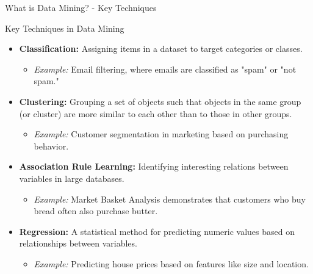 \documentclass[aspectratio=169]{beamer}
\begin{document}
\begin{frame}[fragile]{What is Data Mining? - Key Techniques}
    \begin{block}{Key Techniques in Data Mining}
        \begin{itemize}
            \item \textbf{Classification:} Assigning items in a dataset to target categories or classes. 
            \begin{itemize}
                \item \textit{Example:} Email filtering, where emails are classified as "spam" or "not spam."
            \end{itemize}
            
            \item \textbf{Clustering:} Grouping a set of objects such that objects in the same group (or cluster) are more similar to each other than to those in other groups.
            \begin{itemize}
                \item \textit{Example:} Customer segmentation in marketing based on purchasing behavior.
            \end{itemize}
            
            \item \textbf{Association Rule Learning:} Identifying interesting relations between variables in large databases.
            \begin{itemize}
                \item \textit{Example:} Market Basket Analysis demonstrates that customers who buy bread often also purchase butter.
            \end{itemize}
            
            \item \textbf{Regression:} A statistical method for predicting numeric values based on relationships between variables.
            \begin{itemize}
                \item \textit{Example:} Predicting house prices based on features like size and location.
            \end{itemize}
        \end{itemize}
    \end{block}
\end{frame}
\end{document}
